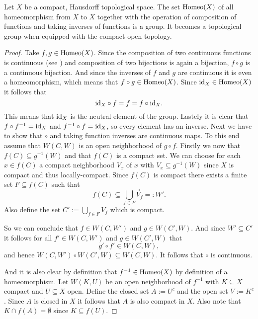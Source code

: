 \begin{ex}
  Let $X$ be a compact, Hausdorff topological space. The set ${\rm Homeo}(X)$ of all homeomorphism from $X$ to $X$ together with the operation of composition of functions and taking inverses of functions is a group. It becomes a topological group when equipped with the compact-open topology.
\end{ex}

\begin{proof}
  Take $f,g \in {\rm Homeo}(X)$. Since the composition of two continuous functions is continuous (see \cite[Satz 2.20]{BvQMT}) and composition of two bijections is again a bijection, $f\circ g$ is a continuous bijection. And since the inverses of $f$ and $g$ are continuous it is even a homeomorphism, which means that $f\circ g \in {\rm Homeo}(X)$. Since ${\rm id}_X \in {\rm Homeo}(X)$ it follows that
  \begin{equation*}
    {\rm id}_X \circ f = f = f \circ {\rm id}_X.
  \end{equation*}
  This means that ${\rm id}_X$ is the neutral element of the group. Lastely it is clear that $f \circ f^{-1} = {\rm id}_X$ and $f^{-1} \circ f = {\rm id}_X$, so every element has an inverse.
Next we have to show that $\circ$ and taking function inverses are continuous maps. To this end assume that $W(C, W)$ is an open neighborhood of $g\circ f$. Firstly we now that $f(C) \subseteq g^{-1}(W)$ and that $f(C)$ is a compact set. We can choose for each $x \in f(C)$ a compact neighborhood $V_x$ of $x$ with $V_x \subseteq g^{-1}(W)$ since $X$ is compact and thus locally-compact. Since $f(C)$ is compact there exists a finite set $F \subseteq f(C)$ such that
\begin{equation*}
  f(C) \subseteq \bigcup\limits_{f\in F}\overset{\circ}{V_f} =: W'.
\end{equation*}
Also define the set $C' := \bigcup\limits_{f\in F} V_f$ which is compact.

So we can conclude that $f \in W(C, W')$ and $g \in W(C', W)$. And since $W' \subseteq C'$ it follows for all $f' \in W(C, W')$ and $g \in W(C', W)$ that
\begin{equation*}
  g' \circ f' \in W(C, W),
\end{equation*}
and hence $W(C, W') \circ W(C', W) \subseteq W(C, W)$. It follows that $\circ$ is continuous.

  And it is also clear by definition that $f^{-1} \in {\rm Homeo}(X)$ by definition of a homeomorphism.
  Let $W(K,U)$ be an open neighborhood of $f^{-1}$ with $K \subseteq X$ compact and $U \subseteq X$ open. Define the closed set $A := U^c$ and the open set $V := K^c$. Since $A$ is closed in $X$ it follows that $A$ is also compact in $X$. Also note that $K\cap f(A) = \emptyset$ since $K \subseteq f(U)$. 


\end{proof}
